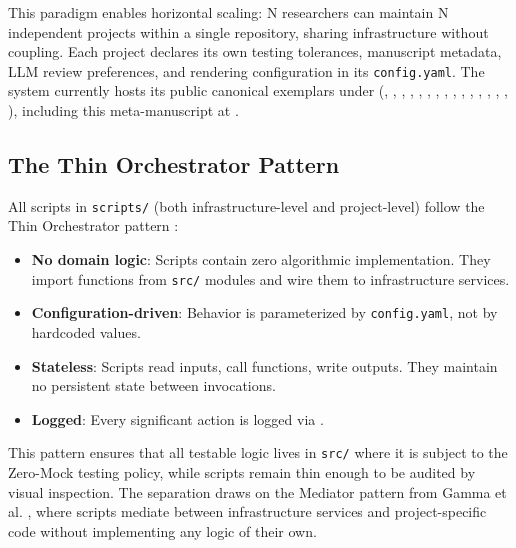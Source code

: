 \documentclass[
]{article}
\providecommand{\tightlist}{%
  \setlength{\itemsep}{0pt}\setlength{\parskip}{0pt}}
\begin{document}
This paradigm enables horizontal scaling: N researchers can maintain N
independent projects within a single repository, sharing infrastructure
without coupling. Each project declares its own testing tolerances,
manuscript metadata, LLM review preferences, and rendering configuration
in its \texttt{config.yaml}. The system currently hosts its public
canonical exemplars under 
(,
,
,
,
,
,
,
,
,
,
,
,
,
,
,
), including this meta-manuscript
at .

\subsection{The Thin Orchestrator
Pattern}\label{the-thin-orchestrator-pattern}

All scripts in \texttt{scripts/} (both infrastructure-level and
project-level) follow the Thin Orchestrator pattern
\citep{gamma1995design}:

\begin{itemize}
\tightlist
\item
  \textbf{No domain logic}: Scripts contain zero algorithmic
  implementation. They import functions from \texttt{src/} modules and
  wire them to infrastructure services.
\item
  \textbf{Configuration-driven}: Behavior is parameterized by
  \texttt{config.yaml}, not by hardcoded values.
\item
  \textbf{Stateless}: Scripts read inputs, call functions, write
  outputs. They maintain no persistent state between invocations.
\item
  \textbf{Logged}: Every significant action is logged via
  .
\end{itemize}

This pattern ensures that all testable logic lives in \texttt{src/}
where it is subject to the Zero-Mock testing policy, while scripts
remain thin enough to be audited by visual inspection. The separation
draws on the Mediator pattern from Gamma et al. \citep{gamma1995design},
where scripts mediate between infrastructure services and
project-specific code without implementing any logic of their own.
\end{document}
